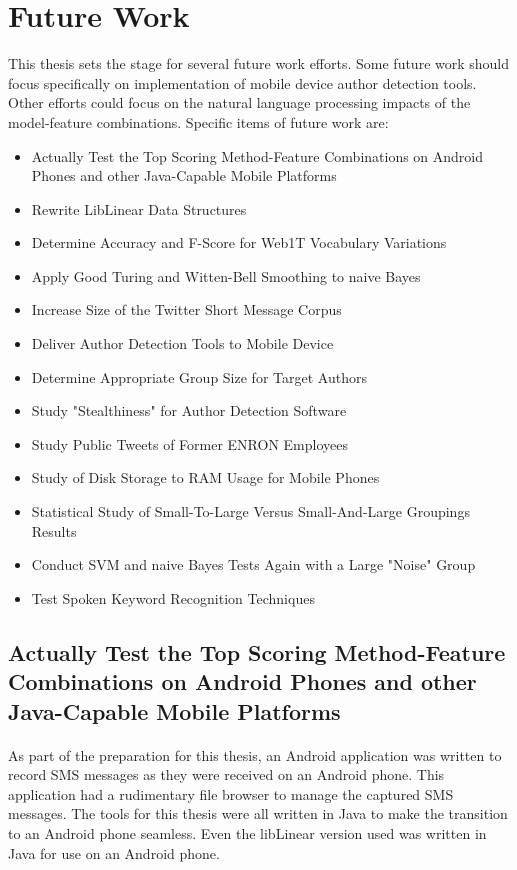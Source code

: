 \section{Future Work}

This thesis sets the stage for several future work efforts.  Some future work should focus specifically on implementation of mobile device author detection tools.  Other efforts could focus on the natural language processing impacts of the model-feature combinations. Specific items of future work are:
\begin{itemize}
	\item Actually Test the Top Scoring Method-Feature Combinations on Android Phones and other Java-Capable Mobile Platforms
	\item Rewrite LibLinear Data Structures
	\item Determine Accuracy and F-Score for Web1T Vocabulary Variations
	\item Apply Good Turing and Witten-Bell Smoothing to naive Bayes
	\item Increase Size of the Twitter Short Message Corpus
	\item Deliver Author Detection Tools to Mobile Device
	\item Determine Appropriate Group Size for Target Authors
	\item Study "Stealthiness" for Author Detection Software 
	\item Study Public Tweets of Former ENRON Employees
	\item Study of Disk Storage to RAM Usage for Mobile Phones
	\item Statistical Study of Small-To-Large Versus Small-And-Large Groupings Results
	\item Conduct SVM and naive Bayes Tests Again with a Large "Noise" Group
	\item Test Spoken Keyword Recognition Techniques
\end{itemize}

\begin{singlespace}
\subsection{Actually Test the Top Scoring Method-Feature Combinations on Android Phones and other Java-Capable Mobile Platforms}
\end{singlespace}
	\paragraph*{} As part of the preparation for this thesis, an Android application was written to record SMS messages as they were received on an Android phone.  This application had a rudimentary file browser to manage the captured SMS messages.  The tools for this thesis were all written in Java to make the transition to an Android phone seamless.  Even the libLinear version used was written in Java for use on an Android phone.
